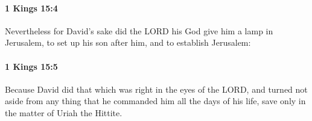 		\paragraph{1 Kings 15:4} %
			\label{1KINGS-15-4}

			Nevertheless for David’s sake did the LORD his God give him a lamp in Jerusalem, to set up his son after him, and to establish Jerusalem:


		\paragraph{1 Kings 15:5} %
			\label{1KINGS-15-5}

			Because David did that which was right in the eyes of the LORD, and turned not aside from any thing that he commanded him all the days of his life, save only in the matter of Uriah the Hittite.


